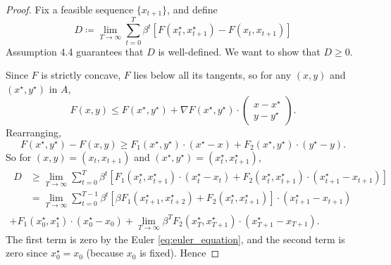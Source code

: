 \documentclass[11pt,letterpaper,reqno,oneside]{article}
\begin{document}
\begin{proof}
	Fix a feasible sequence $\{ x_{t+1} \}$, and define
	\begin{equation*}
		D \coloneqq \lim_{T \to \infty} \sum_{t=0}^T \beta^t \left[
		F(x^\star_t,x^\star_{t+1}) - F(x_t,x_{t+1})
		\right]
	\end{equation*}
	Assumption 4.4 guarantees that $D$ is well-defined. We want to show that $D \geq 0$.

	Since $F$ is strictly concave, $F$ lies below all its tangents, so for any $(x,y)$ and $(x^\star,y^\star)$ in $A$,
	\begin{equation*}
		F(x,y) \leq 
		F\left( x^\star, y^\star \right) 
		+ \nabla F\left( x^\star, y^\star \right) \cdot 
		\begin{pmatrix}
			x - x^\star \\ y - y^\star
		\end{pmatrix} .
	\end{equation*}
	Rearranging,
	\begin{equation*}
		F\left( x^\star, y^\star \right) - F(x,y) 
		\geq 
		F_1 \left( x^\star, y^\star \right) 
		\cdot \left( x^\star - x \right)
		+
		F_2 \left( x^\star, y^\star \right) 
		\cdot \left( y^\star - y \right) .
	\end{equation*}
	So for $(x,y) = (x_t,x_{t+1})$ and $(x^\star,y^\star) = (x_t^\star,x_{t+1}^\star)$,
	\begin{multline*}
		\begin{aligned}
			D 
			&\geq
			\lim_{T \to \infty} \sum_{t=0}^T \beta^t \left[
			F_1 \left( x_t^\star, x_{t+1}^\star \right) 
			\cdot \left( x_t^\star - x_t \right)
			+
			F_2 \left( x_t^\star, x_{t+1}^\star \right) 
			\cdot \left( x_{t+1}^\star - x_{t+1} \right) 
			\right] 
			\\
			&= 
			\lim_{T \to \infty} \sum_{t=0}^{T-1} \beta^t 
			\left[
			\beta F_1 \left( x_{t+1}^\star, x_{t+2}^\star \right) 
			+
			F_2 \left( x_t^\star, x_{t+1}^\star \right) 
			\right]
			\cdot \left( x_{t+1}^\star - x_{t+1} \right) 
		\end{aligned}
		\\
		+ F_1 \left( x_0^\star, x_1^\star \right) 
		\cdot \left( x_0^\star - x_0 \right)
		+ \lim_{T \to \infty} \beta^T
		F_2 \left( x_T^\star, x_{T+1}^\star \right) 
		\cdot \left( x_{T+1}^\star - x_{T+1} \right) .
	\end{multline*}
	The first term is zero by the Euler \cref{eq:euler_equation}, and the second term is zero since $x^\star_0 = x_0$ (because $x_0$ is fixed). Hence

\end{proof}
\end{document}
